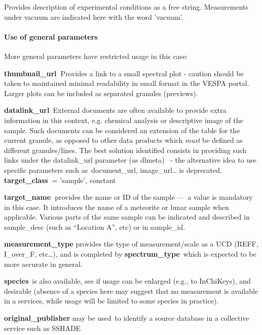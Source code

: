 \documentclass[11pt,a4paper]{ivoa}
\begin{document}
Provides description of experimental conditions as a free string. Measurements under vacuum are indicated here with the word 'vacuum'.

\paragraph{Use of general parameters\textbf{ }}

More general parameters have restricted usage in this case:

\textbf{thumbnail\_url }Provides a link to a small spectral plot - caution should be taken to maintained minimal readability in small format in the VESPA portal. Larger plots can be included as separated granules (previews).

\textbf{datalink\_url} External documents are often available to provide extra information in this context, e.g. chemical analysis or descriptive image of the sample. Such documents can be considered an extension of the table for the current granule, as opposed to other data products which \emph{must} be defined as different granules/lines. The best solution identified consists in providing such links under the datalink\_url parameter (as dlmeta)  - the alternative idea to use specific parameters such as document\_url, image\_url… is deprecated.\\

\textbf{target\_class }= 'sample', constant

\textbf{target\_name }provides the name or ID of the sample — a value is mandatory in this case. It introduces the name of a meteorite or lunar sample when applicable. Various parts of the same sample can be indicated and described in sample\_desc (such as ``Location A'', etc) or in sample\_id.

\textbf{measurement\_type} provides the type of measurement/scale as a UCD (REFF, I\_over\_F, etc…), and is completed by \textbf{spectrum\_type} which is expected to be more accurate in general.

\textbf{species} is also available, see if usage can be enlarged (e.g., to InChiKeys), and desirable (absence of a species here may suggest that no measurement is available in a services, while usage will be limited to some species in practice).

\textbf{original\_publisher }may be used to identify a source database in a collective service such as SSHADE

\\
\end{document}
